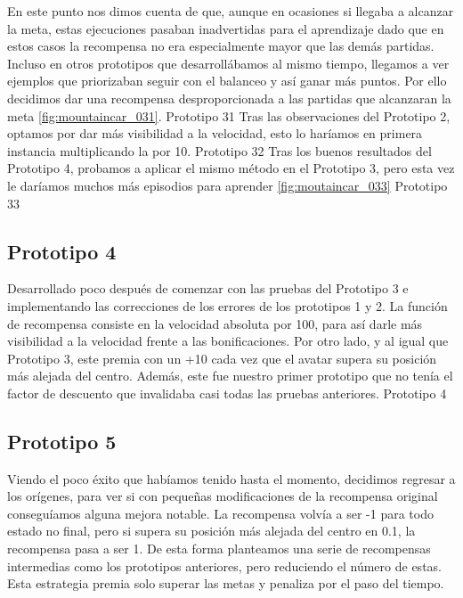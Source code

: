  En este punto nos dimos cuenta de que, aunque en ocasiones si llegaba a alcanzar la meta, estas ejecuciones pasaban inadvertidas para el aprendizaje dado que en estos casos la recompensa no era especialmente mayor que las demás partidas. Incluso en otros prototipos que desarrollábamos al mismo tiempo, llegamos a ver ejemplos que priorizaban seguir con el balanceo y así ganar más puntos.
 Por ello decidimos dar una recompensa desproporcionada a las partidas que alcanzaran la meta \ref{fig:mountaincar_031}.
        {Prototipo 31}  
 Tras las observaciones del Prototipo 2, optamos por dar más visibilidad a la velocidad, esto lo haríamos en primera instancia multiplicando la por 10.
        {Prototipo 32}
 Tras los buenos resultados del Prototipo 4, probamos a aplicar el mismo método en el Prototipo 3, pero esta vez le daríamos muchos más episodios para aprender \ref{fig:moutaincar_033}
        {Prototipo 33}
    
\subsection{Prototipo 4}
 Desarrollado poco después de comenzar con las pruebas del Prototipo 3 e implementando las correcciones de los errores de los prototipos 1 y 2. 
 La función de recompensa consiste en la velocidad absoluta por 100, para así darle más visibilidad a la velocidad frente a las bonificaciones. Por otro lado, y al igual que Prototipo 3, este premia con un +10 cada vez que el avatar supera su posición más alejada del centro. Además, este fue nuestro primer prototipo que no tenía el factor de descuento que invalidaba casi todas las pruebas anteriores.
 {Prototipo 4}
  
 \subsection{Prototipo 5}
 Viendo el poco éxito que habíamos tenido hasta el momento, decidimos regresar a los orígenes, para ver si con pequeñas modificaciones de la recompensa original conseguíamos alguna mejora notable.
 La recompensa volvía a ser -1 para todo estado no final, pero si supera su posición más alejada del centro en 0.1, la recompensa pasa a ser 1. De esta forma planteamos una serie de recompensas intermedias como los prototipos anteriores, pero reduciendo el número de estas. Esta estrategia premia solo superar las metas y penaliza por el paso del tiempo.


